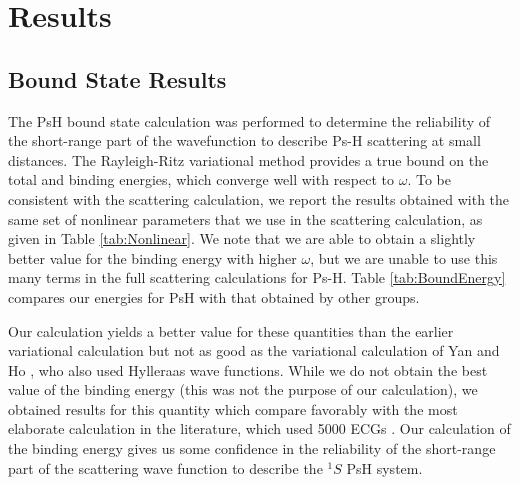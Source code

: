 \documentclass[preprint,showpacs,preprintnumbers,amsmath,amssymb,longbibliography,pra,aps]{revtex4-1}
\begin{document}
\section{Results}
\label{sec:Results}

\subsection{Bound State Results}

The PsH bound state calculation was performed to determine the reliability of the short-range part of the wavefunction to describe Ps-H scattering at small distances. The Rayleigh-Ritz variational method provides a true bound on the total and binding energies, which converge well with respect to $\omega$. To be consistent with the scattering calculation, we report the results obtained with the same set of nonlinear parameters that we use in the scattering calculation, as given in Table \ref{tab:Nonlinear}. We note that we are able to obtain a slightly better value for the binding energy with higher $\omega$, but we are unable to use this many terms in the full scattering calculations for Ps-H. Table \ref{tab:BoundEnergy} compares our energies for PsH with that obtained by other groups.

Our calculation yields a better value for these
quantities than the earlier variational calculation \cite{VanReeth2003,VanReeth2004}
but not as good as the variational calculation of
Yan and Ho \cite{Yan1999}, who also used Hylleraas wave functions.
While we do not obtain the best value of the binding energy
(this was not the purpose of our calculation),
we obtained results for this quantity which compare favorably with
the most elaborate calculation in the literature, which
used 5000 ECGs \cite{Bubin2006}.
Our calculation of the binding energy gives us some confidence
in the reliability of the short-range part of the
scattering wave function to describe
the $^1S$ PsH system.
\end{document}
